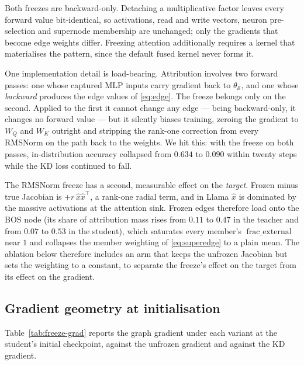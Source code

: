 \documentclass{article}
\DeclareMathOperator{\fracext}{frac\_external}
\newcommand{\Stud}{\mathcal{S}}
\begin{document}
Both freezes are backward-only. Detaching a multiplicative factor leaves every forward value
bit-identical, so activations, read and write vectors, neuron pre-selection and supernode membership
are unchanged; only the gradients that become edge weights differ. Freezing attention additionally
requires a kernel that materialises the pattern, since the default fused kernel never forms it.

One implementation detail is load-bearing. Attribution involves two forward passes: one whose
captured MLP inputs carry gradient back to $\theta_\Stud$, and one whose \emph{backward} produces
the edge values of \eqref{eq:edge}. The freeze belongs only on the second. Applied to the first it
cannot change any edge --- being backward-only, it changes no forward value --- but it silently
biases training, zeroing the gradient to $W_Q$ and $W_K$ outright and stripping the rank-one
correction from every RMSNorm on the path back to the weights. We hit this: with the freeze on both
passes, in-distribution accuracy collapsed from $0.634$ to $0.090$ within twenty steps while the KD
loss continued to fall.

The RMSNorm freeze has a second, measurable effect on the \emph{target}. Frozen minus true
Jacobian is $+r\,\hat{x}\hat{x}^{\top}$, a rank-one radial term, and in Llama $\hat{x}$ is dominated
by the massive activations at the attention sink. Frozen edges therefore load onto the BOS node
(its share of attribution mass rises from $0.11$ to $0.47$ in the teacher and from $0.07$ to
$0.53$ in the student), which saturates every member's $\fracext$ near $1$ and collapses the
member weighting of \eqref{eq:superedge} to a plain mean. The ablation below therefore includes an
arm that keeps the unfrozen Jacobian but sets the weighting to a constant, to separate the freeze's
effect on the target from its effect on the gradient.

\subsection{Gradient geometry at initialisation}

Table~\ref{tab:freeze-grad} reports the graph gradient under each variant at the student's initial
checkpoint, against the unfrozen gradient and against the KD gradient.
\end{document}
